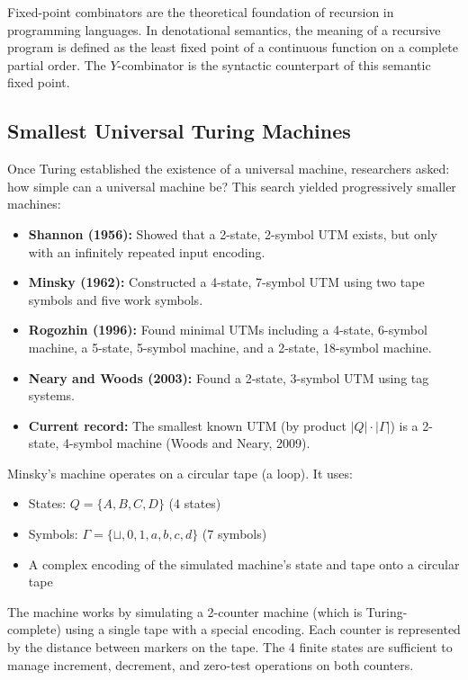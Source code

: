 Fixed-point combinators are the theoretical foundation of recursion in programming languages. In denotational semantics, the meaning of a recursive program is defined as the least fixed point of a continuous function on a complete partial order. The $Y$-combinator is the syntactic counterpart of this semantic fixed point.

\subsection{Smallest Universal Turing Machines}
\label{sec:computation:smallest}

Once Turing established the existence of a universal machine, researchers asked: how simple can a universal machine be? This search yielded progressively smaller machines:

\begin{itemize}
\item \textbf{Shannon (1956):} Showed that a 2-state, 2-symbol UTM exists, but only with an infinitely repeated input encoding.
\item \textbf{Minsky (1962):} Constructed a 4-state, 7-symbol UTM using two tape symbols and five work symbols.
\item \textbf{Rogozhin (1996):} Found minimal UTMs including a 4-state, 6-symbol machine, a 5-state, 5-symbol machine, and a 2-state, 18-symbol machine.
\item \textbf{Neary and Woods (2003):} Found a 2-state, 3-symbol UTM using tag systems.
\item \textbf{Current record:} The smallest known UTM (by product $|Q| \cdot |\Gamma|$) is a 2-state, 4-symbol machine (Woods and Neary, 2009).
\end{itemize}

\begin{example}
Minsky's machine operates on a circular tape (a loop). It uses:
\begin{itemize}
\item States: $Q = \{A, B, C, D\}$ (4 states)
\item Symbols: $\Gamma = \{\sqcup, 0, 1, a, b, c, d\}$ (7 symbols)
\item A complex encoding of the simulated machine's state and tape onto a circular tape
\end{itemize}
The machine works by simulating a 2-counter machine (which is Turing-complete) using a single tape with a special encoding. Each counter is represented by the distance between markers on the tape. The 4 finite states are sufficient to manage increment, decrement, and zero-test operations on both counters.
\end{example}

